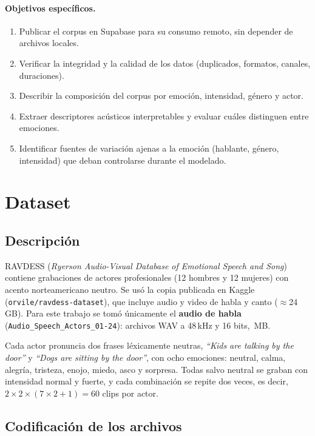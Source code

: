 \documentclass[11pt,a4paper]{article}
\begin{document}
\paragraph{Objetivos específicos.}
\begin{enumerate}[label=\arabic*.]
  \item Publicar el corpus en Supabase para su consumo remoto, sin depender de archivos locales.
  \item Verificar la integridad y la calidad de los datos (duplicados, formatos, canales, duraciones).
  \item Describir la composición del corpus por emoción, intensidad, género y actor.
  \item Extraer descriptores acústicos interpretables y evaluar cuáles distinguen entre emociones.
  \item Identificar fuentes de variación ajenas a la emoción (hablante, género, intensidad) que deban
        controlarse durante el modelado.
\end{enumerate}

\section{Dataset}

\subsection{Descripción}

RAVDESS (\emph{Ryerson Audio-Visual Database of Emotional Speech and Song}) \cite{livingstone2018} contiene
grabaciones de \nActores{} actores profesionales (12 hombres y 12 mujeres) con acento norteamericano neutro.
Se usó la copia publicada en Kaggle (\texttt{orvile/ravdess-dataset}), que incluye audio y video de habla y
canto (\(\approx\)24\,GB). Para este trabajo se tomó únicamente el \textbf{audio de habla}
(\texttt{Audio\_Speech\_Actors\_01-24}): \nClips{} archivos WAV a 48\,kHz y 16 bits, \tamanoMB{}\,MB.

Cada actor pronuncia dos frases léxicamente neutras, \emph{``Kids are talking by the door''} y
\emph{``Dogs are sitting by the door''}, con ocho emociones: neutral, calma, alegría, tristeza, enojo,
miedo, asco y sorpresa. Todas salvo neutral se graban con intensidad normal y fuerte, y cada combinación
se repite dos veces, es decir, $2\times2\times(7\times2+1)=60$ clips por actor.

\subsection{Codificación de los archivos}
\end{document}
